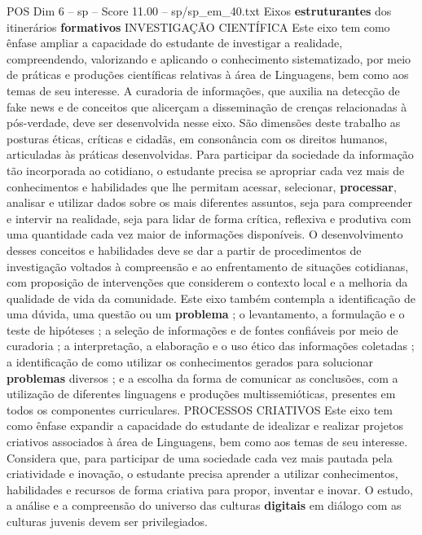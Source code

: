 \begin{textsample}{POS Dim 6 – sp – Score 11.00 – sp/sp\_em\_40.txt}  \label{ex:f6_pos_081}
Eixos \textbf{estruturantes} dos itinerários \textbf{formativos} INVESTIGAÇÃO CIENTÍFICA Este eixo tem como ênfase ampliar a capacidade do estudante de investigar a realidade, compreendendo, valorizando e aplicando o conhecimento sistematizado, por meio de práticas e produções científicas relativas à área de Linguagens, bem como aos temas de seu interesse.
A curadoria de informações, que auxilia na detecção de fake news e de conceitos que alicerçam a disseminação de crenças relacionadas à pós-verdade, deve ser desenvolvida nesse eixo.
São dimensões deste trabalho as posturas éticas, críticas e cidadãs, em consonância com os direitos humanos, articuladas às práticas desenvolvidas.
Para participar da sociedade da informação tão incorporada ao cotidiano, o estudante precisa se apropriar cada vez mais de conhecimentos e habilidades que lhe permitam acessar, selecionar, \textbf{processar}, analisar e utilizar dados sobre os mais diferentes assuntos, seja para compreender e intervir na realidade, seja para lidar de forma crítica, reflexiva e produtiva com uma quantidade cada vez maior de informações disponíveis.
O desenvolvimento desses conceitos e habilidades deve se dar a partir de procedimentos de investigação voltados à compreensão e ao enfrentamento de situações cotidianas, com proposição de intervenções que considerem o contexto local e a melhoria da qualidade de vida da comunidade.
Este eixo também contempla a identificação de uma dúvida, uma questão ou um \textbf{problema} ; o levantamento, a formulação e o teste de hipóteses ; a seleção de informações e de fontes confiáveis por meio de curadoria ; a interpretação, a elaboração e o uso ético das informações coletadas ; a identificação de como utilizar os conhecimentos gerados para solucionar \textbf{problemas} diversos ; e a escolha da forma de comunicar as conclusões, com a utilização de diferentes linguagens e produções multissemióticas, presentes em todos os componentes curriculares.
PROCESSOS CRIATIVOS Este eixo tem como ênfase expandir a capacidade do estudante de idealizar e realizar projetos criativos associados à área de Linguagens, bem como aos temas de seu interesse.
Considera que, para participar de uma sociedade cada vez mais pautada pela criatividade e inovação, o estudante precisa aprender a utilizar conhecimentos, habilidades e recursos de forma criativa para propor, inventar e inovar.
O estudo, a análise e a compreensão do universo das culturas \textbf{digitais} em diálogo com as culturas juvenis devem ser privilegiados.

\end{textsample}
